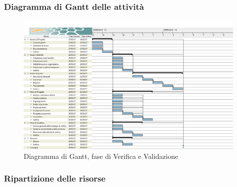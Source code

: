 	\subsubsection{Diagramma di Gantt delle attività}
	\begin{figure}[H]
		\centering
		\includegraphics[scale=0.30]{immagini/gantt/validazione.png}
		\caption{Diagramma di Gantt, fase di Verifica e Validazione}
	\end{figure}
	\subsubsection{Ripartizione delle risorse}